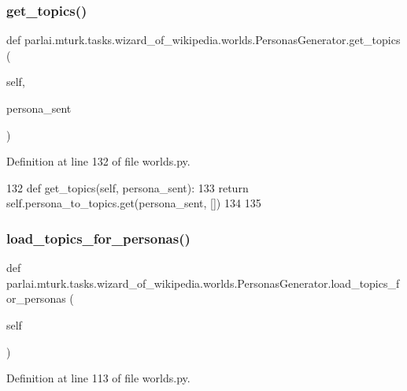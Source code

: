 \subsubsection{\texorpdfstring{get\+\_\+topics()}{get\_topics()}}
{\footnotesize\ttfamily def parlai.\+mturk.\+tasks.\+wizard\+\_\+of\+\_\+wikipedia.\+worlds.\+Personas\+Generator.\+get\+\_\+topics (\begin{DoxyParamCaption}\item[{}]{self,  }\item[{}]{persona\+\_\+sent }\end{DoxyParamCaption})}



Definition at line 132 of file worlds.\+py.


\begin{DoxyCode}
132     \textcolor{keyword}{def }get\_topics(self, persona\_sent):
133         \textcolor{keywordflow}{return} self.persona\_to\_topics.get(persona\_sent, [])
134 
135 
\end{DoxyCode}
\mbox{\label{classparlai_1_1mturk_1_1tasks_1_1wizard__of__wikipedia_1_1worlds_1_1PersonasGenerator_a3fcb297679661fe3955ea3aa416f32c4}} 
\subsubsection{\texorpdfstring{load\+\_\+topics\+\_\+for\+\_\+personas()}{load\_topics\_for\_personas()}}
{\footnotesize\ttfamily def parlai.\+mturk.\+tasks.\+wizard\+\_\+of\+\_\+wikipedia.\+worlds.\+Personas\+Generator.\+load\+\_\+topics\+\_\+for\+\_\+personas (\begin{DoxyParamCaption}\item[{}]{self }\end{DoxyParamCaption})}



Definition at line 113 of file worlds.\+py.


